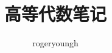 \documentclass{probook}
\title{高等代数笔记}
\author{rogeryoungh}
\begin{document}
\newcommand\mfrac[2]{\dfrac{#1\smash[b]{\strut}}{#2\smash[t]{\strut}}}
\newcommand\RR{\mathbb{R}}
\newcommand\NN{\mathbb{N}}
\newcommand\QQ{\mathbb{Q}}
\newcommand\CC{\mathbb{C}}
\newcommand\ee{\mathrm{e}}
\newcommand\dd{\mathrm{d}}
\newcommand\uppi{\mathrm{\pi}}
\newcommand\transpose[1]{{#1}^\mathsf{T}}

\newcommand\rank{\operatorname{rank}}
\newcommand\diag{\operatorname{diag}}
\renewcommand\Im{\operatorname{Im}}
\newcommand\tr{\operatorname{tr}}

\newcommand\aaa{\boldsymbol{\alpha}}
\newcommand\AAA{\boldsymbol{A}}
\newcommand\bbb{\boldsymbol{\beta}}
\newcommand\eee{\boldsymbol{\eta}}
\renewcommand\ggg{\boldsymbol{\gamma}}
\newcommand\XXX{\boldsymbol{X}}
\newcommand\YYY{\boldsymbol{Y}}
\newcommand\ling{\boldsymbol{0}}

\maketitle

\frontmatter

\tableofcontents

\mainmatter

\end{document}
